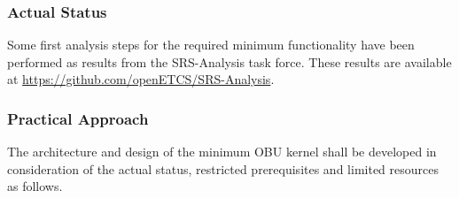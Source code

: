 \subsubsection{Actual Status}
\label{sec:ActualStatus}

Some first analysis steps for the required minimum functionality have been performed as results from the SRS-Analysis task force. These results are available at \url{https://github.com/openETCS/SRS-Analysis}.


\subsubsection{Practical Approach}
\label{sec:PracticalApproach}

The architecture and design of the minimum OBU kernel shall be developed in consideration of the actual status, restricted prerequisites and limited resources as follows. 
